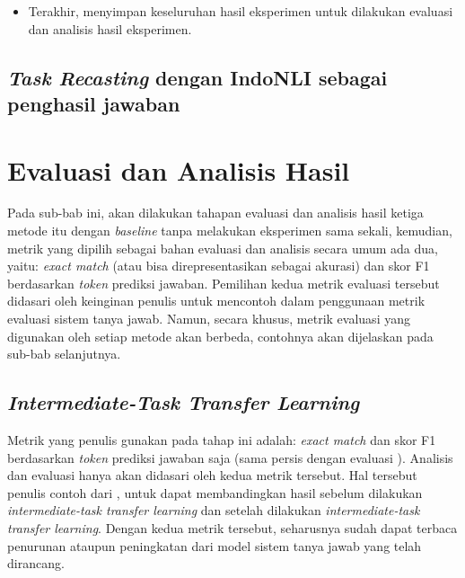 \begin{itemize}
\begin{itemize}
    \end{itemize}
    
    \item Terakhir, menyimpan keseluruhan hasil eksperimen untuk dilakukan evaluasi dan analisis hasil eksperimen.

\end{itemize}

\subsection{\emph{Task Recasting} dengan IndoNLI sebagai penghasil jawaban}
\todo

\section{Evaluasi dan Analisis Hasil}
Pada sub-bab ini, akan dilakukan tahapan evaluasi dan analisis hasil ketiga metode itu dengan \emph{baseline} tanpa melakukan eksperimen sama sekali, kemudian, metrik yang dipilih sebagai bahan evaluasi dan analisis secara umum ada dua, yaitu: \emph{exact match} (atau bisa direpresentasikan sebagai akurasi) dan skor F1 berdasarkan \emph{token} prediksi jawaban. Pemilihan kedua metrik evaluasi tersebut didasari oleh keinginan penulis untuk mencontoh \citep{rajpurkar-etal-2016-squad} dalam penggunaan metrik evaluasi sistem tanya jawab. Namun, secara khusus, metrik evaluasi yang digunakan oleh setiap metode akan berbeda, contohnya akan dijelaskan pada sub-bab selanjutnya.

\subsection{\emph{Intermediate-Task Transfer Learning}}
Metrik yang penulis gunakan pada tahap ini adalah: \emph{exact match} dan skor F1 berdasarkan \emph{token} prediksi jawaban saja (sama persis dengan evaluasi \citep{rajpurkar-etal-2016-squad}). Analisis dan evaluasi hanya akan didasari oleh kedua metrik tersebut. Hal tersebut penulis contoh dari \citet{rajpurkar-etal-2016-squad}, untuk dapat membandingkan hasil sebelum dilakukan \emph{intermediate-task transfer learning} dan setelah dilakukan \emph{intermediate-task transfer learning}. Dengan kedua metrik tersebut, seharusnya sudah dapat terbaca penurunan ataupun peningkatan dari model sistem tanya jawab yang telah dirancang.

